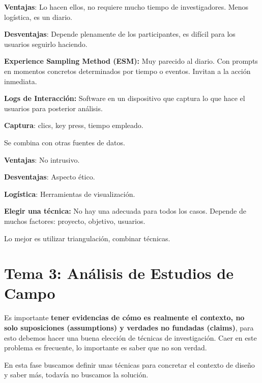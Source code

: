 \hspace{0pt} \textbf{Ventajas}: Lo hacen ellos, no requiere mucho tiempo
de investigadores. Menos logística, es un diario.

\hspace{0pt} \textbf{Desventajas}: Depende plenamente de los
participantes, es difícil para los usuarios seguirlo haciendo.

\hspace{0pt} \textbf{Experience Sampling Method (ESM):} Muy parecido al
diario. Con prompts en momentos concretos determinados por tiempo o
eventos. Invitan a la acción inmediata.

\hspace{0pt} \textbf{Logs de Interacción:} Software en un dispositivo
que captura lo que hace el usuarios para posterior análisis.

\hspace{0pt} \textbf{Captura}: clics, key press, tiempo empleado.

\hspace{0pt} Se combina con otras fuentes de datos.

\hspace{0pt} \textbf{Ventajas}: No intrusivo.

\hspace{0pt} \textbf{Desventajas}: Aspecto ético.

\hspace{0pt} \textbf{Logística}: Herramientas de visualización.

\textbf{Elegir una técnica:} No hay una adecuada para todos los casos.
Depende de muchos factores: proyecto, objetivo, usuarios.

\hspace{0pt} Lo mejor es utilizar triangulación, combinar técnicas.

\hypertarget{tema-3-anuxe1lisis-de-estudios-de-campo}{%
\section{Tema 3: Análisis de Estudios de
Campo}\label{tema-3-anuxe1lisis-de-estudios-de-campo}}

Es importante \textbf{tener evidencias de cómo es realmente el contexto,
no solo suposiciones (assumptions) y verdades no fundadas (claims)},
para esto debemos hacer una buena elección de técnicas de investigación.
Caer en este problema es frecuente, lo importante es saber que no son
verdad.

En esta fase buscamos definir unas técnicas para concretar el contexto
de diseño y saber más, todavía no buscamos la solución.

